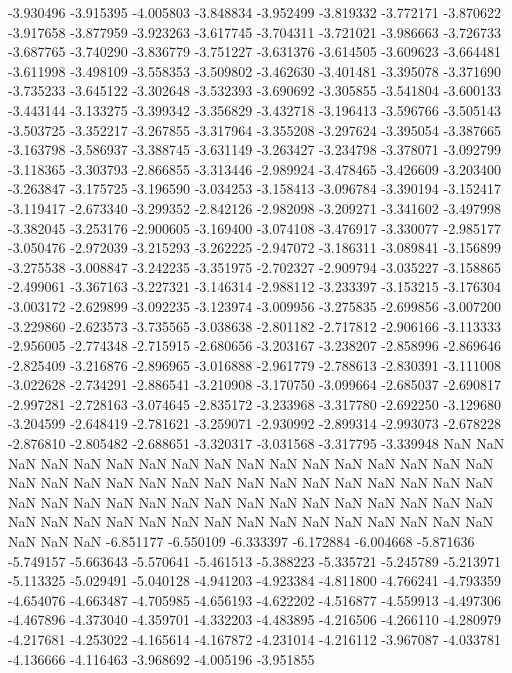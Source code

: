 -3.930496
-3.915395
-4.005803
-3.848834
-3.952499
-3.819332
-3.772171
-3.870622
-3.917658
-3.877959
-3.923263
-3.617745
-3.704311
-3.721021
-3.986663
-3.726733
-3.687765
-3.740290
-3.836779
-3.751227
-3.631376
-3.614505
-3.609623
-3.664481
-3.611998
-3.498109
-3.558353
-3.509802
-3.462630
-3.401481
-3.395078
-3.371690
-3.735233
-3.645122
-3.302648
-3.532393
-3.690692
-3.305855
-3.541804
-3.600133
-3.443144
-3.133275
-3.399342
-3.356829
-3.432718
-3.196413
-3.596766
-3.505143
-3.503725
-3.352217
-3.267855
-3.317964
-3.355208
-3.297624
-3.395054
-3.387665
-3.163798
-3.586937
-3.388745
-3.631149
-3.263427
-3.234798
-3.378071
-3.092799
-3.118365
-3.303793
-2.866855
-3.313446
-2.989924
-3.478465
-3.426609
-3.203400
-3.263847
-3.175725
-3.196590
-3.034253
-3.158413
-3.096784
-3.390194
-3.152417
-3.119417
-2.673340
-3.299352
-2.842126
-2.982098
-3.209271
-3.341602
-3.497998
-3.382045
-3.253176
-2.900605
-3.169400
-3.074108
-3.476917
-3.330077
-2.985177
-3.050476
-2.972039
-3.215293
-3.262225
-2.947072
-3.186311
-3.089841
-3.156899
-3.275538
-3.008847
-3.242235
-3.351975
-2.702327
-2.909794
-3.035227
-3.158865
-2.499061
-3.367163
-3.227321
-3.146314
-2.988112
-3.233397
-3.153215
-3.176304
-3.003172
-2.629899
-3.092235
-3.123974
-3.009956
-3.275835
-2.699856
-3.007200
-3.229860
-2.623573
-3.735565
-3.038638
-2.801182
-2.717812
-2.906166
-3.113333
-2.956005
-2.774348
-2.715915
-2.680656
-3.203167
-3.238207
-2.858996
-2.869646
-2.825409
-3.216876
-2.896965
-3.016888
-2.961779
-2.788613
-2.830391
-3.111008
-3.022628
-2.734291
-2.886541
-3.210908
-3.170750
-3.099664
-2.685037
-2.690817
-2.997281
-2.728163
-3.074645
-2.835172
-3.233968
-3.317780
-2.692250
-3.129680
-3.204599
-2.648419
-2.781621
-3.259071
-2.930992
-2.899314
-2.993073
-2.678228
-2.876810
-2.805482
-2.688651
-3.320317
-3.031568
-3.317795
-3.339948
NaN
NaN
NaN
NaN
NaN
NaN
NaN
NaN
NaN
NaN
NaN
NaN
NaN
NaN
NaN
NaN
NaN
NaN
NaN
NaN
NaN
NaN
NaN
NaN
NaN
NaN
NaN
NaN
NaN
NaN
NaN
NaN
NaN
NaN
NaN
NaN
NaN
NaN
NaN
NaN
NaN
NaN
NaN
NaN
NaN
NaN
NaN
NaN
NaN
NaN
NaN
NaN
NaN
NaN
NaN
NaN
NaN
NaN
NaN
NaN
NaN
NaN
NaN
NaN
NaN
-6.851177
-6.550109
-6.333397
-6.172884
-6.004668
-5.871636
-5.749157
-5.663643
-5.570641
-5.461513
-5.388223
-5.335721
-5.245789
-5.213971
-5.113325
-5.029491
-5.040128
-4.941203
-4.923384
-4.811800
-4.766241
-4.793359
-4.654076
-4.663487
-4.705985
-4.656193
-4.622202
-4.516877
-4.559913
-4.497306
-4.467896
-4.373040
-4.359701
-4.332203
-4.483895
-4.216506
-4.266110
-4.280979
-4.217681
-4.253022
-4.165614
-4.167872
-4.231014
-4.216112
-3.967087
-4.033781
-4.136666
-4.116463
-3.968692
-4.005196
-3.951855
